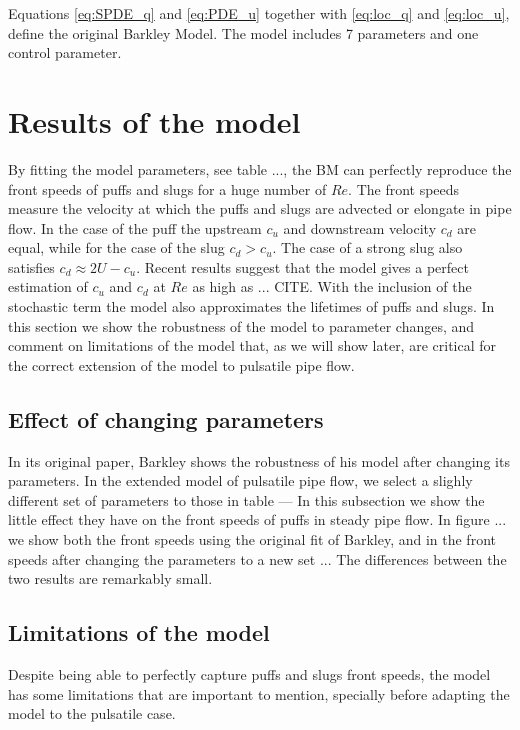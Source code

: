 \documentclass{article}
\begin{document}
Equations \ref{eq:SPDE_q} and \ref{eq:PDE_u} together with \ref{eq:loc_q} and \ref{eq:loc_u}, define the original Barkley Model. The model includes 7 parameters and one control parameter.




\section{Results of the model}
By fitting the model parameters, see table ..., the BM can perfectly reproduce the front speeds of puffs and slugs for a huge number of $Re$. The front speeds measure the velocity at which the puffs and slugs are advected or elongate in pipe flow. In the case of the puff the upstream $c_{u}$ and downstream velocity $c_{d}$ are equal, while for the case of the slug $c_{d}>c_{u}$. The case of a strong slug also satisfies $c_{d}\approx 2U-c_{u}$. Recent results suggest that the model gives a perfect estimation of $c_{u}$ and $c_{d}$ at $Re$ as high as ... CITE. With the inclusion of the stochastic term the model also approximates the lifetimes of puffs and slugs. In this section we show the robustness of the model to parameter changes, and comment on limitations of the model that, as we will show later, are critical for the correct extension of the model to pulsatile pipe flow. 

\subsection{Effect of changing parameters}
In its original paper, Barkley shows the robustness of his model after changing its parameters. In the extended model of pulsatile pipe flow, we select a slighly different set of parameters to those in table --- In this subsection we show the little effect they have on the front speeds of puffs in steady pipe flow. In figure ... we show both the front speeds using the original fit of Barkley, and in the front speeds after changing the parameters to a new set ... The differences between the two results are remarkably small.




\subsection{Limitations of the model}
Despite being able to perfectly capture puffs and slugs front speeds, the model has some limitations that are important to mention, specially before adapting the model to the pulsatile case.
\end{document}
